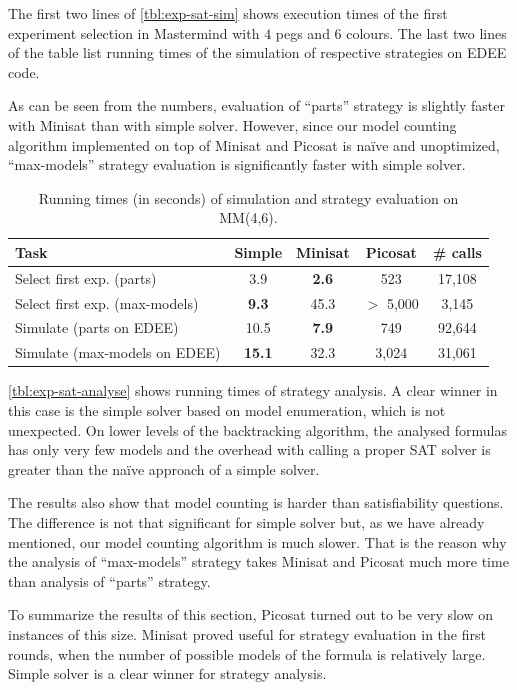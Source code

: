 The first two lines of \autoref{tbl:exp-sat-sim} shows execution times of the
  first experiment selection in Mastermind with $4$ pegs and $6$ colours.
The last two lines of the table list running times of the simulation of
  respective strategies on EDEE code.

As can be seen from the numbers, evaluation of ``parts'' strategy is slightly
  faster with Minisat than with simple solver.
However, since our model counting algorithm implemented on top of Minisat and Picosat
  is na\"ive and unoptimized, ``max-models'' strategy evaluation is significantly faster
  with simple solver.

\begin{table}[h]
\begin{center}
\begin{tabular}{|l|c|c|c|c|} \hline
Task & Simple & Minisat & Picosat & \# calls \\ \hline
Select first exp. (parts) & 3.9 & \textbf{2.6} & 523 & 17,108 \\
Select first exp. (max-models) & \textbf{9.3} & 45.3 & $>$ 5,000 & 3,145 \\
Simulate (parts on EDEE) & 10.5 & \textbf{7.9} & 749 & 92,644 \\
Simulate (max-models on EDEE) & \textbf{15.1} & 32.3 & 3,024 & 31,061 \\\hline
\end{tabular}
\caption{Running times (in seconds) of simulation and strategy evaluation on MM(4,6).}
\label{tbl:exp-sat-sim}
\end{center}
\end{table}

\autoref{tbl:exp-sat-analyse}
  shows running times of strategy analysis.
A clear winner in this case is the simple solver based on
  model enumeration,
  which is not unexpected.
On lower levels of the backtracking algorithm,
  the analysed formulas has only very few models and the
  overhead with calling a proper SAT solver is greater
  than the na\"ive approach of a simple solver.

The results also show that model counting is harder than satisfiability questions.
The difference is not that significant for simple solver
 but, as we have already mentioned, our model counting algorithm is much slower.
That is the reason why the analysis of ``max-models'' strategy takes Minisat and Picosat
  much more time than analysis of ``parts'' strategy.

To summarize the results of this section,
Picosat turned out to be very slow on instances of this size. Minisat proved
useful for strategy evaluation in the first rounds, when the number of possible
models of the formula is relatively large.
Simple solver is a clear winner for strategy analysis.


